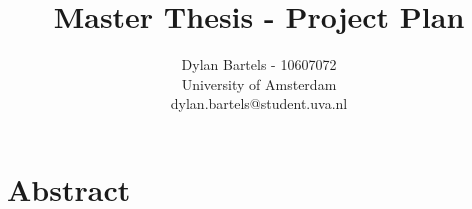 \documentclass[11pt]{article}
\begin{document}
\title{Master Thesis - Project Plan}
\author{Dylan Bartels - 10607072\\University of Amsterdam \\dylan.bartels@student.uva.nl}
\maketitle

\section{Abstract}



\end{document}
